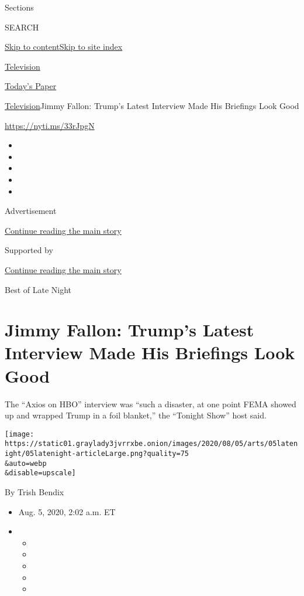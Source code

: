 Sections

SEARCH

\protect\hyperlink{site-content}{Skip to
content}\protect\hyperlink{site-index}{Skip to site index}

\href{https://www.nytimes3xbfgragh.onion/section/arts/television}{Television}

\href{https://myaccount.nytimes3xbfgragh.onion/auth/login?response_type=cookie\&client_id=vi}{}

\href{https://www.nytimes3xbfgragh.onion/section/todayspaper}{Today's
Paper}

\href{/section/arts/television}{Television}\textbar{}Jimmy Fallon:
Trump's Latest Interview Made His Briefings Look Good

\url{https://nyti.ms/33rJpgN}

\begin{itemize}
\item
\item
\item
\item
\item
\end{itemize}

Advertisement

\protect\hyperlink{after-top}{Continue reading the main story}

Supported by

\protect\hyperlink{after-sponsor}{Continue reading the main story}

Best of Late Night

\hypertarget{jimmy-fallon-trumps-latest-interview-made-his-briefings-look-good}{%
\section{Jimmy Fallon: Trump's Latest Interview Made His Briefings Look
Good}\label{jimmy-fallon-trumps-latest-interview-made-his-briefings-look-good}}

The ``Axios on HBO'' interview was ``such a disaster, at one point FEMA
showed up and wrapped Trump in a foil blanket,'' the ``Tonight Show''
host said.

\texttt{[image: https://static01.graylady3jvrrxbe.onion/images/2020/08/05/arts/05latenight/05latenight-articleLarge.png?quality=75\\\&auto=webp\\\&disable=upscale]}

By Trish Bendix

\begin{itemize}
\item
  Aug. 5, 2020, 2:02 a.m. ET
\item
  \begin{itemize}
  \item
  \item
  \item
  \item
  \item
  \end{itemize}
\end{itemize}

